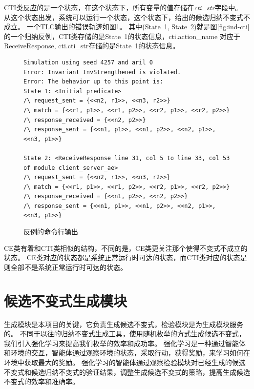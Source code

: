 CTI类反应的是一个状态，在这个状态下，所有变量的值存储在\textit{cti\_str}字段中。
从这个状态出发，系统可以运行一个状态，这个状态下，给出的候选归纳不变式不成立。
一个TLC输出的错误轨迹如图\ref{lst:cti_cmd}。
其中(State\ 1, State\ 2)就是图\ref{fig:ind-cti}的一个归纳反例，CTI类存储的是State\ 1的状态信息，cti.action\_name 对应于ReceiveResponse,
cti.cti\_str存储的是State\ 1的状态信息。

\begin{figure}
	
\begin{lstlisting}
Simulation using seed 4257 and aril 0
Error: Invariant InvStrengthened is violated.
Error: The behavior up to this point is:
State 1: <Initial predicate>
/\ request_sent = {<<n2, r1>>, <<n3, r2>>}
/\ match = {<<r1, p1>>, <<r1, p2>>, <<r2, p1>>, <<r2, p2>>}
/\ response_received = {<<n2, p2>>}
/\ response_sent = {<<n1, p1>>, <<n1, p2>>, <<n2, p1>>, <<n3, p1>>}

State 2: <ReceiveResponse line 31, col 5 to line 33, col 53 of module client_server_ae>
/\ request_sent = {<<n2, r1>>, <<n3, r2>>}
/\ match = {<<r1, p1>>, <<r1, p2>>, <<r2, p1>>, <<r2, p2>>}
/\ response_received = {<<n1, p2>>, <<n2, p2>>}
/\ response_sent = {<<n1, p1>>, <<n1, p2>>, <<n2, p1>>, <<n3, p1>>}	
\end{lstlisting}
\caption{反例的命令行输出}
\label{lst:cti_cmd}
\end{figure}

CE类有着和CTI类相似的结构，不同的是，CE类更关注那个使得不变式不成立的状态。
CE类对应的状态都是系统正常运行时可达的状态，而CTI类对应的状态是则全部不是系统正常运行时可达的状态。


\section{候选不变式生成模块}

生成模块是本项目的关键，它负责生成候选不变式，检验模块是为生成模块服务的。
不同于以往的归纳不变式生成工具，使用随机枚举的方式生成候选不变式，我们引入强化学习来提高我们枚举的效率和成功率。
强化学习是一种通过智能体和环境的交互，智能体通过观察环境的状态，采取行动，获得奖励，来学习如何在环境中获取最大的奖励。
强化学习的智能体通过观察检验模块对已经生成的候选不变式和候选归纳不变式的验证结果，调整生成候选不变式的策略，提高生成候选不变式的效率和准确率。

